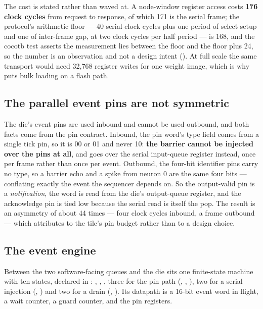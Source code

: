 The cost is stated rather than waved at. A node-window register access
costs \textbf{176 clock cycles} from request to response, of which 171
is the serial frame; the protocol's arithmetic floor --- 40
serial-clock cycles plus one period of select setup and one of
inter-frame gap, at two clock cycles per half period --- is 168, and
the cocotb test asserts the measurement lies between the floor and the
floor plus 24, so the number is an observation and not a design intent
(). At full scale the same transport would need
32,768 register writes for one weight image, which is why
 puts bulk loading on a flash path.

\subsection{The parallel event pins are not symmetric}

The die's event pins are used inbound and cannot be used outbound, and
both facts come from the pin contract. Inbound, the pin word's type
field comes from a single tick pin, so it is 00 or 01 and never 10:
\textbf{the barrier cannot be injected over the pins at all}, and goes
over the serial input-queue register instead, once per frame rather
than once per event. Outbound, the four-bit identifier pins carry no
type, so a barrier echo and a spike from neuron 0 are the same four
bits --- conflating exactly the event the sequencer depends on. So the
output-valid pin is a \emph{notification}, the word is read from the
die's output-queue register, and the acknowledge pin is tied low
because the serial read is itself the pop. The result is an asymmetry
of about 44 times --- four clock cycles inbound, a frame outbound ---
which  attributes to the tile's pin budget rather
than to a design choice.

\subsection{The event engine}

Between the two software-facing queues and the die sits one
finite-state machine with ten states, declared in
: ,
, , three for the pin path
(, , ), two for a
serial injection (, ) and two for a
drain (, ). Its datapath is a 16-bit
event word in flight, a wait counter, a guard counter, and the pin
registers.


